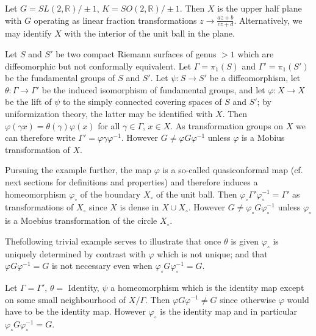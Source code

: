\begin{example}\label{chap9:exp9.1}
  Let $G= SL (2, \mathbb{R})/\pm 1$, $K= SO(2, \mathbb{R})/\pm
  1$. Then $X$ is the upper half plane with $G$ operating as linear
  fraction transformations $z \to \frac{az+b}{cz+d}$. Alternatively,
  we may identify $X$ with the interior of the unit ball in the
  plane. 
\end{example}

Let $S$ and $S'$ be two compact Riemann surfaces of genus $> 1$ which
are diffeomorphic but not conformally equivalent. Let $\Gamma =
\pi_1(S)$ and $\Gamma' = \pi_1 (S')$ be the fundamental groups of $S$
and $S'$. Let $\psi: S \to S'$ be a diffeomorphism, let $\theta:
\Gamma \to \Gamma'$ be the induced isomorphism of fundamental groups,
and let $\varphi : X \to X$ be the lift of $\psi$ to the simply
connected covering spaces of $S$ and $S'$; by uniformization theory,
the latter may be identified with $X$. Then $\varphi (\gamma x)=
\theta (\gamma) \varphi (x)$ for all $\gamma \in \Gamma$, $x \in
X$. As transformation groups on $X$ we can therefore write $\Gamma'=
\varphi \gamma \varphi^{-1}$. However $G \neq \varphi G \varphi^{-1}$
unless $\varphi$ is a Mobius transformation of $X$.

Pursuing the example further, the map $\varphi$ is a so-called
quasiconformal map (cf. next sections for definitions and properties)
and therefore induces a homeomorphism $\varphi_\circ$ of the boundary
$X_\circ$ of the unit ball. Then $\varphi_\circ \Gamma'
\varphi_\circ^{-1}= \Gamma'$ as transformations of $X_\circ$ since $X$
is dense in $X \cup X_\circ$. However $G \neq \varphi_\circ G
\varphi_\circ^{-1}$ unless $\varphi_\circ$ is a Moebius transformation
of the circle $X_\circ$.

The\pageoriginale following trivial example serves to illustrate that
once $\theta$ is given $\varphi_\circ$ is uniquely determined by
contrast with $\varphi$ which is not unique; and that $\varphi G
\varphi^{-1}=G$ is not necessary even when $\varphi_\circ G
\varphi_\circ^{-1}=G$.

\begin{example} \label{chap9:exp9.2}
  Let $\Gamma = \Gamma'$, $\theta=$ Identity, $\psi$ a homeomorphism
  which is the identity map except on some small neighbourhood of
  $X/\Gamma$. Then $\varphi G \varphi^{-1}\neq G$ since otherwise
  $\varphi$ would have to be the identity map. However $\varphi_\circ$
  is the identity map and in particular $\varphi_\circ G
  \varphi_\circ^{-1}=G$.
\end{example}

